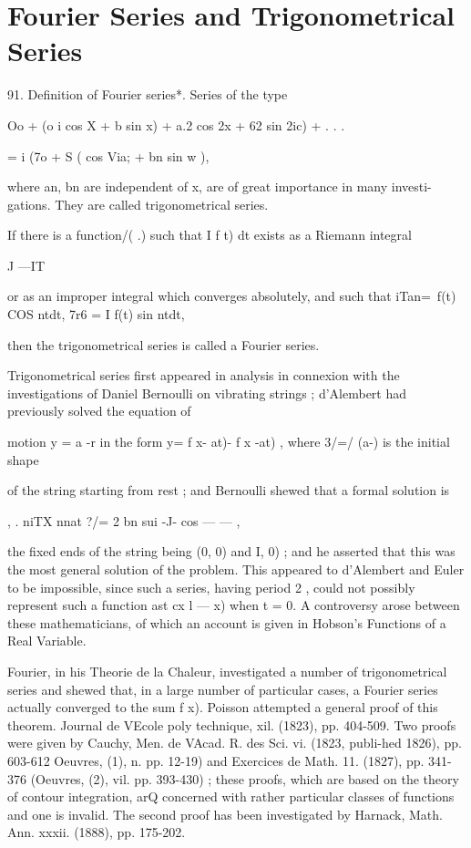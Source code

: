 \chapter{Fourier Series and Trigonometrical Series} 

91. Definition of Fourier series*. 
Series of the type 

 Oo + (o i cos X + b  sin x) +  a.2 cos 2x + 62 sin 2ic) + . . . 

= i (7o + S (   cos Via; + bn sin w ), 

where an, bn are independent of x, are of great importance in many investi- 
gations. They are called trigonometrical series. 

If there is a function/( .) such that I f t) dt exists as a Riemann integral 

J —IT 

or as an improper integral which converges absolutely, and such that 
iTan=\ f(t) COS ntdt, 7r6  = I f(t) sin ntdt, 

then the trigonometrical series is called a Fourier series. 

Trigonometrical series first appeared in analysis in connexion with the investigations 
of Daniel Bernoulli on vibrating strings ; d'Alembert had previously solved the equation of 

motion y = a  -r in the form y=   f  x- at)- f  x -at) , where 3/=/ (a-) is the initial shape 

of the string starting from rest ; and Bernoulli shewed that a formal solution is 

  , . niTX nnat 
?/= 2 bn sui -J- cos —  — , 

the fixed ends of the string being (0, 0) and  I, 0) ; and he asserted that this was the most 
general solution of the problem. This appeared to d'Alembert and Euler to be impossible, 
since such a series, having period 2 , could not possibly represent such a function ast 
cx l — x) when t = 0. A controversy arose between these mathematicians, of which an 
account is given in Hobson's Functions of a Real Variable. 

Fourier, in his Theorie de la Chaleur, investigated a number of trigonometrical series 
and shewed that, in a large number of particular cases, a Fourier series actually converged 
to the sum f x). Poisson attempted a general proof of this theorem. Journal de VEcole 
poly technique, xil. (1823), pp. 404-509. Two proofs were given by Cauchy, Men. de 
VAcad. R. des Sci. vi. (1823, publi-hed 1826), pp. 603-612  Oeuvres, (1), n. pp. 12-19) 
and Exercices de Math. 11. (1827), pp. 341-376 (Oeuvres, (2), vil. pp. 393-430) ; these proofs, 
which are based on the theory of contour integration, arQ concerned with rather particular 
classes of functions and one is invalid. The second proof has been investigated by 
Harnack, Math. Ann. xxxii. (1888), pp. 175-202. 

